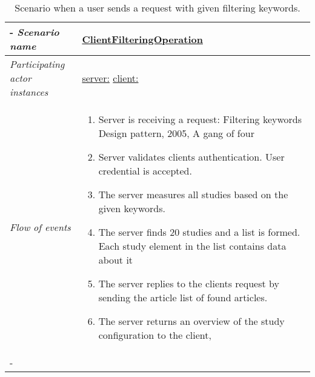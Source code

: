 \documentclass{article}
\begin{document}
%
%
\begin{table}[h!]
	\tabulinesep=1.5mm
	\begin{tabu} to 
		\tabucline[1.5pt]-
		\textit{Scenario name} & \underline{ClientFilteringOperation} \\
		\hline
		\textit{Participating actor 
		\newline instances} & \underline{server:\serverside}
		\newline \underline{client:\clientside} \\
		\hline
		\textit{Flow of events} &
		\vspace{-3mm}
		\begin{enumerate}[leftmargin=*,topsep=0pt,itemsep=-1ex]
			\item Server is receiving a request: Filtering keywords {Design pattern, 2005, A gang of four}
			
			\item Server validates clients authentication. User credential is accepted.
			
			\item The server measures all studies based on the given keywords.
			
			\item The server finds 20 studies and a list is formed. Each study element in the list contains data about it
			
			\item The server replies to the clients request by sending the article list of found articles.
			
			\item The server returns an overview of the study configuration to the client, 
		\end{enumerate} \\
		\tabucline[1.5pt]-
	\end{tabu}
		\caption{Scenario when a user sends a request with given filtering keywords.}
		\label{sc:ClientFilteringOperation}
\end{table}
\end{document}
